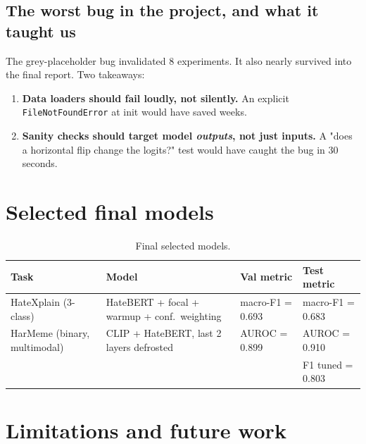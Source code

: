 \documentclass[11pt,a4paper]{article}
\begin{document}
\subsection{The worst bug in the project, and what it taught us}

The grey-placeholder bug invalidated 8 experiments. It also nearly survived into
the final report. Two takeaways:

\begin{enumerate}[leftmargin=*]
    \item \textbf{Data loaders should fail loudly, not silently.} An explicit
    \texttt{FileNotFoundError} at init would have saved weeks.
    \item \textbf{Sanity checks should target model \emph{outputs}, not just
    inputs.} A "does a horizontal flip change the logits?" test would have caught
    the bug in 30 seconds.
\end{enumerate}

\section{Selected final models}

\begin{table}[h]
\centering\small
\caption{Final selected models.}
\begin{tabular}{l l l l}
\toprule
Task & Model & Val metric & Test metric \\
\midrule
HateXplain (3-class) & HateBERT + focal + warmup + conf.\ weighting
& macro-F1 = 0.693 & macro-F1 = 0.683 \\
HarMeme (binary, multimodal) & CLIP + HateBERT, last 2 layers defrosted
& AUROC = 0.899 & AUROC = 0.910 \\
& & & F1 tuned = 0.803 \\
\bottomrule
\end{tabular}
\end{table}

\section{Limitations and future work}
\end{document}
